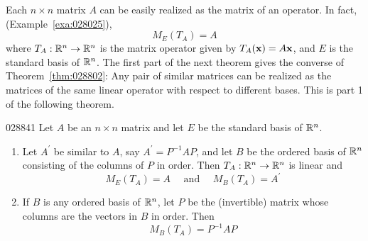 Each $n \times n$ matrix $A$ can be easily realized as the matrix of an operator. In fact, (Example~\ref{exa:028025}),
\begin{equation*}
M_E(T_A) = A
\end{equation*}
where $T_{A} : \mathbb{R}^n \to \mathbb{R}^n$ is the matrix operator given by $T_{A}(\textbf{x}) = A\textbf{x}$, and $E$ is the standard basis of $\mathbb{R}^n$. The first part of the next theorem gives the converse of Theorem~\ref{thm:028802}: Any pair of similar matrices can be realized as the matrices of the same linear operator with respect to different bases. This is part 1 of the following theorem.


\begin{theorem}{}{028841}
Let $A$ be an $n \times n$ matrix and let $E$ be the standard basis of $\mathbb{R}^n$.


\begin{enumerate}
\item Let $A^{\prime}$ be similar to $A$, say $A^{\prime} = P^{-1}AP$, and let $B$ be the ordered basis of $\mathbb{R}^n$ consisting of the columns of $P$ in order. Then $T_{A} : \mathbb{R}^n \to \mathbb{R}^n$ is linear and
\begin{equation*}
M_E(T_A) = A \quad \mbox{ and } \quad M_B(T_A) = A^{\prime}
\end{equation*}
\item If $B$ is any ordered basis of $\mathbb{R}^n$, let $P$ be the (invertible) matrix whose columns are the vectors in $B$ in order. Then
\begin{equation*}
M_B(T_A) = P^{-1}AP
\end{equation*}
\end{enumerate}
\end{theorem}

